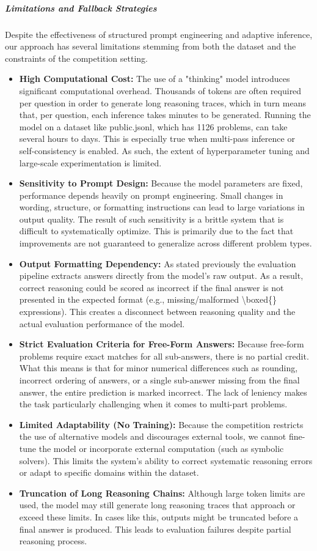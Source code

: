\documentclass{article}
\begin{document}
\subparagraph{Limitations and Fallback Strategies} Despite the effectiveness of structured prompt engineering and adaptive inference, our approach has several limitations stemming from both the dataset and the constraints of the competition setting.
\begin{itemize}
    \item \textbf{High Computational Cost:} The use of a "thinking" model introduces significant computational overhead. Thousands of tokens are often required per question in order to generate long reasoning traces, which in turn means that, per question, each inference takes minutes to be generated. Running the model on a dataset like public.jsonl, which has 1126 problems, can take several hours to days. This is especially true when multi-pass inference or self-consistency is enabled. As such, the extent of hyperparameter tuning and large-scale experimentation is limited.
    \item \textbf{Sensitivity to Prompt Design:} Because the model parameters are fixed, performance depends heavily on prompt engineering. Small changes in wording, structure, or formatting instructions can lead to large variations in output quality. The result of such sensitivity is a brittle system that is difficult to systematically optimize. This is primarily due to the fact that improvements are not guaranteed to generalize across different problem types.
    \item \textbf{Output Formatting Dependency:} As stated previously the evaluation pipeline extracts answers directly from the model's raw output. As a result, correct reasoning could be scored as incorrect if the final answer is not presented in the expected format (e.g., missing/malformed \textbackslash boxed\{\} expressions). This creates a disconnect between reasoning quality and the actual evaluation performance of the model.
    \item \textbf{Strict Evaluation Criteria for Free-Form Answers:} Because free-form problems require exact matches for all sub-answers, there is no partial credit. What this means is that for minor numerical differences such as rounding, incorrect ordering of answers, or a single sub-answer missing from the final answer, the entire prediction is marked incorrect. The lack of leniency makes the task particularly challenging when it comes to multi-part problems.
    \item \textbf{Limited Adaptability (No Training):} Because the competition restricts the use of alternative models and discourages external tools, we cannot fine-tune the model or incorporate external computation (such as symbolic solvers). This limits the system's ability to correct systematic reasoning errors or adapt to specific domains within the dataset.
    \item \textbf{Truncation of Long Reasoning Chains:} Although large token limits are used, the model may still generate long reasoning traces that approach or exceed these limits. In cases like this, outputs might be truncated before a final answer is produced. This leads to evaluation failures despite partial reasoning process.
\end{itemize}
\end{document}
